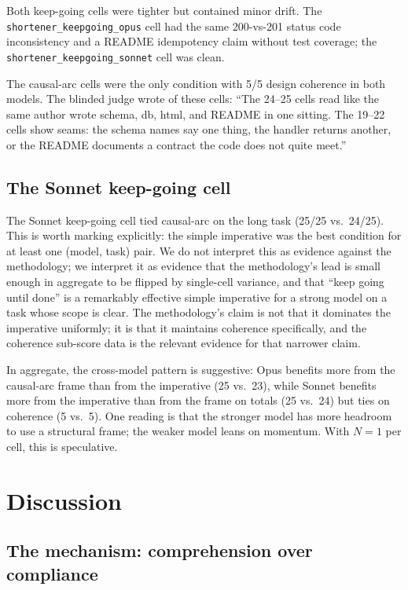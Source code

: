 \documentclass[11pt]{article}
\begin{document}
Both keep-going cells were tighter but contained minor drift. The
\texttt{shortener\_keepgoing\_opus} cell had the same 200-vs-201 status
code inconsistency and a README idempotency claim without test coverage;
the \texttt{shortener\_keepgoing\_sonnet} cell was clean.

The causal-arc cells were the only condition with 5/5 design coherence in
both models. The blinded judge wrote of these cells: ``The 24--25 cells
read like the same author wrote schema, db, html, and README in one
sitting. The 19--22 cells show seams: the schema names say one thing, the
handler returns another, or the README documents a contract the code does
not quite meet.''

\subsection{The Sonnet keep-going cell}

The Sonnet keep-going cell tied causal-arc on the long task (25/25 vs.\
24/25). This is worth marking explicitly: the simple imperative was the
best condition for at least one (model, task) pair. We do not interpret
this as evidence against the methodology; we interpret it as evidence that
the methodology's lead is small enough in aggregate to be flipped by
single-cell variance, and that ``keep going until done'' is a remarkably
effective simple imperative for a strong model on a task whose scope is
clear. The methodology's claim is not that it dominates the imperative
uniformly; it is that it maintains coherence specifically, and the
coherence sub-score data is the relevant evidence for that narrower
claim.

In aggregate, the cross-model pattern is suggestive: Opus benefits more
from the causal-arc frame than from the imperative (25 vs.\ 23), while
Sonnet benefits more from the imperative than from the frame on totals
(25 vs.\ 24) but ties on coherence (5 vs.\ 5). One reading is that the
stronger model has more headroom to use a structural frame; the weaker
model leans on momentum. With $N=1$ per cell, this is speculative.

\section{Discussion}

\subsection{The mechanism: comprehension over compliance}
\end{document}
